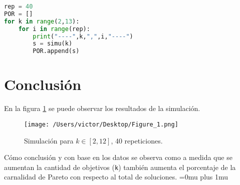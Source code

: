 \documentclass{article}
\begin{document}
\begin{lstlisting}[language=Python]
rep = 40
POR = []
for k in range(2,13):
    for i in range(rep):
        print("----",k,",",i,"----")
        s = simu(k)
        POR.append(s)
\end{lstlisting}






\section{Conclusión}

En la figura \ref{f1} se puede observar los resultados de la simulación. 

\begin{figure}[H]
\begin{center}
	\texttt{[image: /Users/victor/Desktop/Figure\_1.png]}
	\caption{ Simulación para $k \in [2,12]$, 40 repeticiones.}
	\label{f1}
\end{center}
\end{figure}

Cómo conclusión y con base en los datos se observa como a medida que se aumentan la cantidad de objetivos (\texttt{k}) también aumenta el porcentaje de la carnalidad de Pareto con respecto al total de soluciones.
\Urlmuskip=0mu plus 1mu\relax


\end{document}
